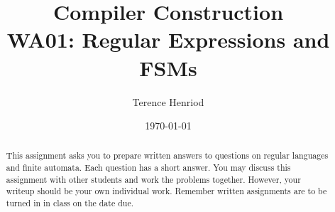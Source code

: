 \documentclass{article}
\title{Compiler Construction \\ WA01: Regular Expressions and FSMs}
\author{Terence Henriod}
\date{\today}
\begin{document}
\clearpage            %
\maketitle            %
\thispagestyle{empty} %

\begin{abstract}
\noindent This assignment asks you to prepare written answers to questions on regular languages
and finite automata. Each question has a short answer. You may discuss this assignment
with other students and work the problems together. However, your writeup should be your
own individual work. Remember written assignments are to be turned in in class on the date
due.
\end{abstract}

\newpage
\end{document}
